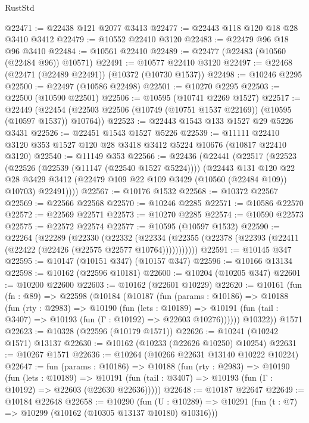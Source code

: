 \begin{lexlean}{RustStd}
\begin{coremodule}
@22471 := @22438 @121 @2077 @3413
@22477 := @22443 @118 @120 @18 @28 @3410 @3412
@22479 := @10552 @22410 @3120
@22483 := @22479 @96 @18 @96 @3410
@22484 := @10561 @22410
@22489 := @22477 (@22483 (@10560 (@22484 @96)) @10571)
@22491 := @10577 @22410 @3120
@22497 := @22468 (@22471 (@22489 @22491)) (@10372 (@10730 @1537))
@22498 := @10246 @2295
@22500 := @22497 (@10586 @22498)
@22501 := @10270 @2295
@22503 := @22500 (@10590 @22501)
@22506 := @10595 (@10741 @2269 @1527)
@22517 := @22449
    (@22454 (@22503 @22506 (@10749 (@10751 @1537 @22169)) (@10595 (@10597 @1537)) @10764))
@22523 := @22443 @1543 @133 @1527 @29 @5226 @3431
@22526 := @22451 @1543 @1527 @5226
@22539 := @11111 @22410 @3120 @353 @1527 @120 @28 @3418 @3412 @5224 @10676 (@10817 @22410 @3120)
@22540 := @11149 @353
@22566 := @22436
    (@22441
      (@22517
        (@22523
          (@22526 (@22539 (@11147 (@22540 @1527 @5224))))
          (@22443
            @131
            @120
            @22
            @28
            @3429
            @3412
            (@22479 @109 @22 @109 @3429 (@10560 (@22484 @109)) @10703)
            @22491))))
@22567 := @10176 @1532
@22568 := @10372 @22567
@22569 := @22566 @22568
@22570 := @10246 @2285
@22571 := @10586 @22570
@22572 := @22569 @22571
@22573 := @10270 @2285
@22574 := @10590 @22573
@22575 := @22572 @22574
@22577 := @10595 (@10597 @1532)
@22590 := @22264
    (@22289
      (@22330
        (@22332
          (@22334 (@22355 (@22378 (@22393 (@22411 (@22422 (@22426 (@22575 @22577 @10764)))))))))))
@22591 := @10145 @347
@22595 := @10147 (@10151 @347) (@10157 @347)
@22596 := @10166 @13134
@22598 := @10162 (@22596 @10181)
@22600 := @10204 (@10205 @347)
@22601 := @10200 @22600
@22603 := @10162 (@22601 @10229)
@22620 := @10161
    (fun (fn : @89) =>
    @22598
      (@10184
        (@10187
          (fun (params : @10186) =>
          @10188
            (fun (rty : @2983) =>
            @10190
              (fun (lets : @10189) =>
              @10191 (fun (tail : @3407) => @10193 (fun (Γ : @10192) => @22603 @10276))))))
        @10322))
    @1571
@22623 := @10328 (@22596 (@10179 @1571))
@22626 := @10241 (@10242 @1571) @13137
@22630 := @10162 (@10233 (@22626 @10250) @10254)
@22631 := @10267 @1571
@22636 := @10264 (@10266 @22631 @13140 @10222 @10224)
@22647 := fun (params : @10186) =>
  @10188
    (fun (rty : @2983) =>
    @10190
      (fun (lets : @10189) =>
      @10191 (fun (tail : @3407) => @10193 (fun (Γ : @10192) => @22603 (@22630 @22636)))))
@22648 := @10187 @22647
@22649 := @10184 @22648
@22658 := @10290
    (fun (U : @10289) => @10291 (fun (t : @7) => @10299 (@10162 (@10305 @13137 @10180) @10316)))

\end{coremodule}
\end{lexlean}
